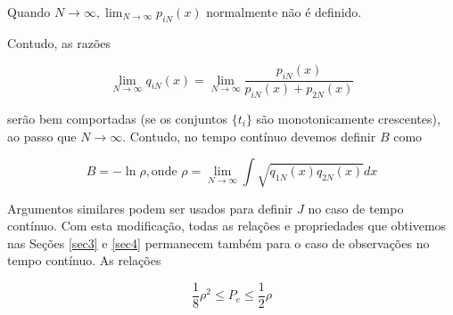 \documentclass{sbrt2017port}
\begin{document}
Quando $N \rightarrow \infty, \lim_{N \rightarrow \infty} p_{iN}(x) $ normalmente não é definido.

Contudo, as razões

\begin{equation}
	\lim_{N \rightarrow \infty} q_{iN}(x) = \lim_{N \rightarrow \infty} \frac{p_{iN}(x)}{p_{iN}(x) + p_{2N}(x)}
	\label{eq76}
\end{equation}

serão bem comportadas (se os conjuntos $\{t_i\}$ são monotonicamente crescentes), ao passo que $N \rightarrow \infty$. Contudo, no tempo contínuo devemos definir $B$ como

\begin{equation}
		B = - \ln \rho, \text{onde } \rho = \lim_{N \rightarrow \infty} \int \sqrt{q_{1N}(x)q_{2N}(x)}dx
	\label{eq77}
\end{equation}

Argumentos similares podem ser usados para definir $J$ no caso de tempo contínuo. Com esta modificação, todas as relações e propriedades que obtivemos nas Seções \ref{sec3} e \ref{sec4} permanecem também para o caso de observações no tempo contínuo. As relações

\begin{equation}
	\frac{1}{8} \rho^2 \leq P_e \leq \frac{1}{2} \rho
	\label{eq78}
\end{equation}
\end{document}
